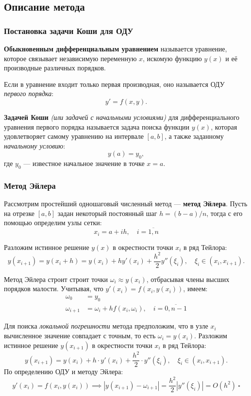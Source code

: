 \subsection{Описание метода}

\subsubsection{Постановка задачи Коши для ОДУ}

\textbf{Обыкновенным дифференциальным уравнением} называется уравнение, которое связывает независимую переменную $x$, искомую функцию $y(x)$ и её производные различных порядков.

Если в уравнение входит только первая производная, оно называется ОДУ \textit{первого порядка}:
\[
y' = f(x, y).
\]

\textbf{Задачей Коши} \textit{(или задачей с начальными условиями)} для дифференциального уравнения первого порядка называется задача поиска функции $y(x)$, которая удовлетворяет самому уравнению на интервале $[a, b]$, а также заданному \textit{начальному условию}:
\[
y(a) = y_0,
\]
где $y_0$ --- известное начальное значение в точке $x = a$. 

\subsubsection{Метод Эйлера}

Рассмотрим простейший одношаговый численный метод --- \textbf{метод Эйлера}. Пусть на отрезке $[a, b]$ задан некоторый постоянный шаг $h = (b-a)\slash n$, тогда с его помощью определим узлы сетки:
\[
  x_i=a+ih,\quad i=\overline{1,n}  
\]

Разложим истинное решение $y(x)$ в окрестности точки $x_i$ в ряд Тейлора:
\[
y(x_{i+1}) = y(x_i + h) = y(x_i) + h y'(x_i) + \frac{h^2}{2} y''(\xi_i), \quad \xi_i \in (x_i, x_{i+1}).
\]

Метод Эйлера строит строит точки \( \omega_i\approx y(x_i) \), отбрасывая члены высших порядков малости. Учитывая, что $y'(x_i) = f(x_i, y(x_i))$, имеем:
\[
  \begin{aligned}
    \omega_0&=y_0 \\
    \omega_{i+1} &= \omega_i + h f(x_i, \omega_i), \quad i = \overline{0,n-1}
  \end{aligned}
\]

Для поиска \textit{локальной погрешности} метода предположим, что в узле $x_i$ вычисленное значение совпадает с точным, то есть $\omega_i = y(x_i)$. Разложим истинное решение $y(x_{i+1})$ в окрестности точки $x_i$ в ряд Тейлора:
\[
y(x_{i+1}) = y(x_i) + h \cdot y'(x_i) + \frac{h^2}{2} \cdot y''(\xi_i), \quad \xi_i \in (x_i, x_{i+1}).
\]
По определению ОДУ и методу Эйлера:
\[
  y'(x_i) = f(x_i, y(x_i))\implies |y(x_{i+1}) - \omega_{i+1}| = \frac{h^2}{2} |y''(\xi_i)| = O(h^2)\ \square
\]

